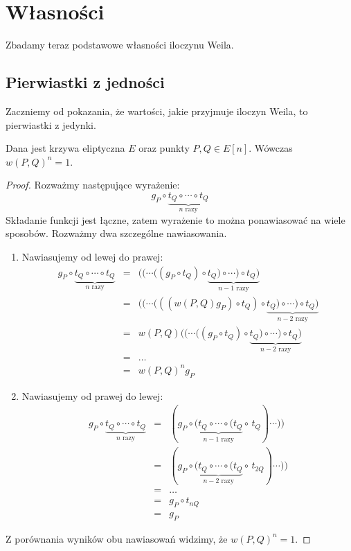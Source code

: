 \section{Własności}

Zbadamy teraz podstawowe własności iloczynu Weila.

\subsection*{Pierwiastki z jedności}

Zaczniemy od pokazania, że wartości, jakie przyjmuje iloczyn Weila,
to pierwiastki z jedynki.

\begin{theorem}
Dana jest krzywa eliptyczna $E$ oraz punkty $P, Q \in E[n]$.
Wówczas $w(P,Q)^n = 1$.
\end{theorem}

\begin{proof}
Rozważmy następujące wyrażenie:
\begin{equation*}
g_P \circ \underbrace{t_Q \circ \cdots \circ t_Q}_{n\textrm{ razy}}
\end{equation*}
Składanie funkcji jest łączne,
zatem wyrażenie to można ponawiasować na wiele sposobów.
Rozważmy dwa szczególne nawiasowania.
\begin{enumerate}
\item
Nawiasujemy od lewej do prawej:
\begin{eqnarray*}
g_P \circ \underbrace{t_Q \circ \cdots \circ t_Q}_{n\textrm{ razy}}
& = & ((\cdots((g_P \circ t_Q) \circ
      \underbrace{t_Q) \circ \cdots ) \circ t_Q)}_{n-1\textrm{ razy}} \\
& = & ((\cdots(((w(P,Q)g_P) \circ t_Q) \circ
      \underbrace{t_Q) \circ \cdots ) \circ t_Q)}_{n-2\textrm{ razy}} \\
& = & w(P,Q)((\cdots((g_P \circ t_Q) \circ
      \underbrace{t_Q) \circ \cdots ) \circ t_Q)}_{n-2\textrm{ razy}} \\
& = & \ldots \\
& = & w(P,Q)^ng_P
\end{eqnarray*}
\item
Nawiasujemy od prawej do lewej:
\begin{eqnarray*}
g_P \circ \underbrace{t_Q \circ \cdots \circ t_Q}_{n\textrm{ razy}}
& = & (g_P \circ
      \underbrace{(t_Q \circ \cdots \circ (t_Q}_{n-1\textrm{ razy}}
      \circ\,t_Q)\cdots)) \\
& = & (g_P \circ
      \underbrace{(t_Q \circ \cdots \circ (t_Q}_{n-2\textrm{ razy}}
      \circ\,t_{2Q})\cdots)) \\
& = & \ldots \\
& = & g_P \circ t_{nQ} \\
& = & g_P
\end{eqnarray*}
\end{enumerate}
Z porównania wyników obu nawiasowań widzimy, że $w(P,Q)^n = 1$.
\end{proof}

